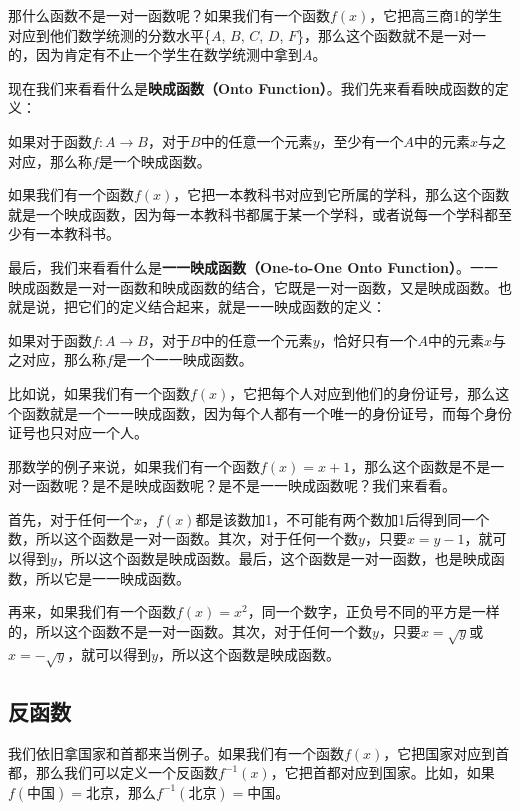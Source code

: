 \documentclass[UTF8]{ctexart}
\begin{document}
那什么函数不是一对一函数呢？如果我们有一个函数$f(x)$，它把高三商1的学生对应到他们数学统测的分数水平\{$A$, $B$, $C$, $D$, $F$\}，那么这个函数就不是一对一的，因为肯定有不止一个学生在数学统测中拿到$A$。

现在我们来看看什么是\textbf{映成函数（Onto Function）}。我们先来看看映成函数的定义：

\begin{info}[映成函数的定义]
    如果对于函数$f: A \to B$，对于$B$中的任意一个元素$y$，至少有一个$A$中的元素$x$与之对应，那么称$f$是一个映成函数。
\end{info}

如果我们有一个函数$f(x)$，它把一本教科书对应到它所属的学科，那么这个函数就是一个映成函数，因为每一本教科书都属于某一个学科，或者说每一个学科都至少有一本教科书。

最后，我们来看看什么是\textbf{一一映成函数（One-to-One Onto Function）}。一一映成函数是一对一函数和映成函数的结合，它既是一对一函数，又是映成函数。也就是说，把它们的定义结合起来，就是一一映成函数的定义：

\begin{info}[一一映成函数的定义]
    如果对于函数$f: A \to B$，对于$B$中的任意一个元素$y$，恰好只有一个$A$中的元素$x$与之对应，那么称$f$是一个一一映成函数。
\end{info}

比如说，如果我们有一个函数$f(x)$，它把每个人对应到他们的身份证号，那么这个函数就是一个一一映成函数，因为每个人都有一个唯一的身份证号，而每个身份证号也只对应一个人。

那数学的例子来说，如果我们有一个函数$f(x) = x + 1$，那么这个函数是不是一对一函数呢？是不是映成函数呢？是不是一一映成函数呢？我们来看看。

首先，对于任何一个$x$，$f(x)$都是该数加1，不可能有两个数加1后得到同一个数，所以这个函数是一对一函数。其次，对于任何一个数$y$，只要$x = y - 1$，就可以得到$y$，所以这个函数是映成函数。最后，这个函数是一对一函数，也是映成函数，所以它是一一映成函数。

再来，如果我们有一个函数$f(x) = x^2$，同一个数字，正负号不同的平方是一样的，所以这个函数不是一对一函数。其次，对于任何一个数$y$，只要$x = \sqrt{y}$或$x = -\sqrt{y}$，就可以得到$y$，所以这个函数是映成函数。

\subsection{反函数}

我们依旧拿国家和首都来当例子。如果我们有一个函数$f(x)$，它把国家对应到首都，那么我们可以定义一个反函数$f^{-1}(x)$，它把首都对应到国家。比如，如果$f(\text{中国}) = \text{北京}$，那么$f^{-1}(\text{北京}) = \text{中国}$。
\end{document}
